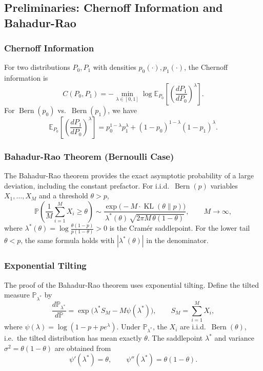 \subsection{Preliminaries: Chernoff Information and Bahadur-Rao}
\label{sec:thm4_prelim}

\subsubsection{Chernoff Information}

For two distributions $P_0,P_1$ with densities $p_0(\cdot),p_1(\cdot)$,
the Chernoff information is
\[
C(P_0,P_1) = -\min_{\lambda\in[0,1]}
  \log\mathbb{E}_{P_0}\!\left[\left(\frac{dP_1}{dP_0}\right)^{\!\!\lambda}\right].
\]
For $\operatorname{Bern}(p_0)$ vs.\ $\operatorname{Bern}(p_1)$, we have
\[
\mathbb{E}_{P_0}\!\left[\left(\frac{dP_1}{dP_0}\right)^{\!\!\lambda}\right]
= p_0^{1-\lambda}p_1^\lambda + (1-p_0)^{1-\lambda}(1-p_1)^\lambda.
\]

\subsubsection{Bahadur-Rao Theorem (Bernoulli Case)}

The Bahadur-Rao theorem \cite{bahadur1960deviations} provides the exact
asymptotic probability of a large deviation, including the constant
prefactor.  For i.i.d.\ $\operatorname{Bern}(p)$ variables
$X_1,\dots,X_M$ and a threshold $\theta>p$,
\[
\mathbb{P}\!\left(\frac1M\sum_{i=1}^M X_i \ge \theta\right)
\sim
\frac{\exp\!\bigl(-M\cdot\operatorname{KL}(\theta\|p)\bigr)}
     {\lambda^*(\theta)\,\sqrt{2\pi M\,\theta(1-\theta)}},
\qquad M\to\infty,
\]
where $\lambda^*(\theta)=\log\frac{\theta(1-p)}{p(1-\theta)}>0$ is the
Cram\'er saddlepoint.  For the lower tail $\theta<p$, the same formula
holds with $|\lambda^*(\theta)|$ in the denominator.

\subsubsection{Exponential Tilting}

The proof of the Bahadur-Rao theorem uses exponential tilting.  Define the
tilted measure $\mathbb{P}_{\lambda^*}$ by
\[
\frac{d\mathbb{P}_{\lambda^*}}{d\mathbb{P}}
= \exp\!\bigl(\lambda^* S_M - M\psi(\lambda^*)\bigr),\qquad
S_M=\sum_{i=1}^M X_i,
\]
where $\psi(\lambda)=\log(1-p+pe^\lambda)$.  Under $\mathbb{P}_{\lambda^*}$,
the $X_i$ are i.i.d.\ $\operatorname{Bern}(\theta)$, i.e.\ the tilted
distribution has mean exactly $\theta$.  The saddlepoint $\lambda^*$ and
variance $\sigma^2=\theta(1-\theta)$ are obtained from
\[
\psi'(\lambda^*)=\theta,\qquad
\psi''(\lambda^*)=\theta(1-\theta).
\]

